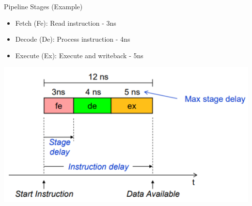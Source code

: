\begin{concept}{Pipeline Stages} (Example)
\begin{itemize}
  \item Fetch (Fe): Read instruction - 3ns
  \item Decode (De): Process instruction - 4ns
  \item Execute (Ex): Execute and writeback - 5ns
\end{itemize}

\includegraphics[width=0.8\linewidth]{images/pipelinestages.png}
\end{concept}

